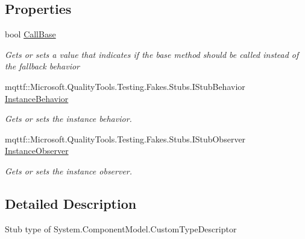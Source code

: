 \subsection*{Properties}
\begin{DoxyCompactItemize}
\item 
bool \hyperlink{class_system_1_1_component_model_1_1_fakes_1_1_stub_custom_type_descriptor_a9ff7276d8bbc8311206597c94e8f4d63}{Call\-Base}
\begin{DoxyCompactList}\small\item\em Gets or sets a value that indicates if the base method should be called instead of the fallback behavior\end{DoxyCompactList}\item 
mqttf\-::\-Microsoft.\-Quality\-Tools.\-Testing.\-Fakes.\-Stubs.\-I\-Stub\-Behavior \hyperlink{class_system_1_1_component_model_1_1_fakes_1_1_stub_custom_type_descriptor_a0f5dff5ca3c8a624e4cf35296e8cd2b4}{Instance\-Behavior}
\begin{DoxyCompactList}\small\item\em Gets or sets the instance behavior.\end{DoxyCompactList}\item 
mqttf\-::\-Microsoft.\-Quality\-Tools.\-Testing.\-Fakes.\-Stubs.\-I\-Stub\-Observer \hyperlink{class_system_1_1_component_model_1_1_fakes_1_1_stub_custom_type_descriptor_afba67a70deda858fe5d55708f9fd48b9}{Instance\-Observer}
\begin{DoxyCompactList}\small\item\em Gets or sets the instance observer.\end{DoxyCompactList}\end{DoxyCompactItemize}


\subsection{Detailed Description}
Stub type of System.\-Component\-Model.\-Custom\-Type\-Descriptor



